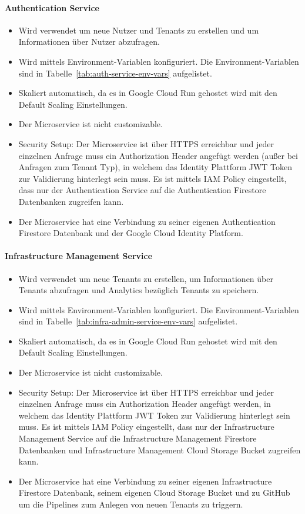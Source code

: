 \paragraph{Authentication Service}
\label{sec:auth-service}
\begin{itemize}
	\item Wird verwendet um neue Nutzer und Tenants zu erstellen und um Informationen über Nutzer abzufragen.
	\item Wird mittels Environment-Variablen konfiguriert. Die Environment-Variablen sind in Tabelle~\ref{tab:auth-service-env-vars} aufgelistet.
	\item Skaliert automatisch, da es in Google Cloud Run gehostet wird mit den Default Scaling Einstellungen.
	\item Der Microservice ist nicht customizable.
	\item Security Setup: Der Microservice ist über HTTPS erreichbar und jeder einzelnen Anfrage muss ein Authorization Header angefügt werden (außer bei Anfragen zum Tenant Typ), in welchem das Identity Plattform JWT Token zur Validierung hinterlegt sein muss. Es ist mittels IAM Policy eingestellt, dass nur der Authentication Service auf die Authentication Firestore Datenbanken zugreifen kann.
	\item Der Microservice hat eine Verbindung zu seiner eigenen Authentication Firestore Datenbank und der Google Cloud Identity Platform.
\end{itemize}

\paragraph{Infrastructure Management Service}
\begin{itemize}
	\item Wird verwendet um neue Tenants zu erstellen, um Informationen über Tenants abzufragen und Analytics bezüglich Tenants zu speichern.
	\item Wird mittels Environment-Variablen konfiguriert. Die Environment-Variablen sind in Tabelle~\ref{tab:infra-admin-service-env-vars} aufgelistet.
	\item Skaliert automatisch, da es in Google Cloud Run gehostet wird mit den Default Scaling Einstellungen.
	\item Der Microservice ist nicht customizable.
	\item Security Setup: Der Microservice ist über HTTPS erreichbar und jeder einzelnen Anfrage muss ein Authorization Header angefügt werden, in welchem das Identity Plattform JWT Token zur Validierung hinterlegt sein muss. Es ist mittels IAM Policy eingestellt, dass nur der Infrastructure Management Service auf die Infrastructure Management Firestore Datenbanken und Infrastructure Management Cloud Storage Bucket zugreifen kann.
	\item Der Microservice hat eine Verbindung zu seiner eigenen Infrastructure Firestore Datenbank, seinem eigenen Cloud Storage Bucket und zu GitHub um die Pipelines zum Anlegen von neuen Tenants zu triggern.
\end{itemize}

